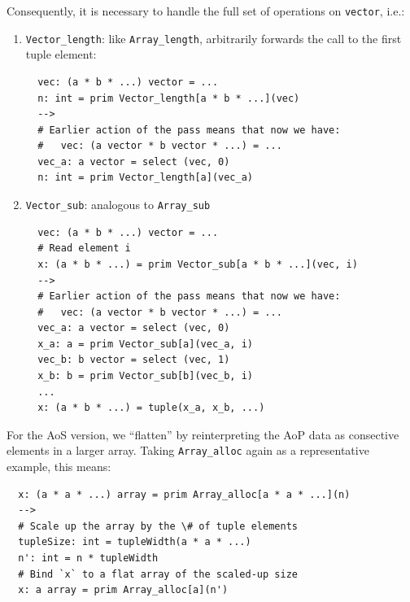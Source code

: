 \documentclass[leqno,11pt]{article}
\begin{document}
Consequently, it is necessary to handle the full set of operations on
\texttt{vector}, i.e.:
\begin{enumerate}
\item \texttt{Vector\_length}: like \texttt{Array\_length}, arbitrarily forwards
  the call to the first tuple element:

\begin{verbatim}
  vec: (a * b * ...) vector = ...
  n: int = prim Vector_length[a * b * ...](vec)
  -->
  # Earlier action of the pass means that now we have:
  #   vec: (a vector * b vector * ...) = ...
  vec_a: a vector = select (vec, 0)
  n: int = prim Vector_length[a](vec_a)
\end{verbatim}

\item \texttt{Vector\_sub}: analogous to \texttt{Array\_sub}

\begin{verbatim}
  vec: (a * b * ...) vector = ...
  # Read element i
  x: (a * b * ...) = prim Vector_sub[a * b * ...](vec, i)
  -->
  # Earlier action of the pass means that now we have:
  #   vec: (a vector * b vector * ...) = ...
  vec_a: a vector = select (vec, 0)
  x_a: a = prim Vector_sub[a](vec_a, i)
  vec_b: b vector = select (vec, 1)
  x_b: b = prim Vector_sub[b](vec_b, i)
  ...
  x: (a * b * ...) = tuple(x_a, x_b, ...)
\end{verbatim}

\end{enumerate}

For the AoS version, we ``flatten'' by reinterpreting the AoP data as consective
elements in a larger array. Taking \texttt{Array\_alloc} again as a
representative example, this means:
\begin{verbatim}
  x: (a * a * ...) array = prim Array_alloc[a * a * ...](n)
  -->
  # Scale up the array by the \# of tuple elements
  tupleSize: int = tupleWidth(a * a * ...)
  n': int = n * tupleWidth
  # Bind `x` to a flat array of the scaled-up size
  x: a array = prim Array_alloc[a](n')
\end{verbatim}
\end{document}
